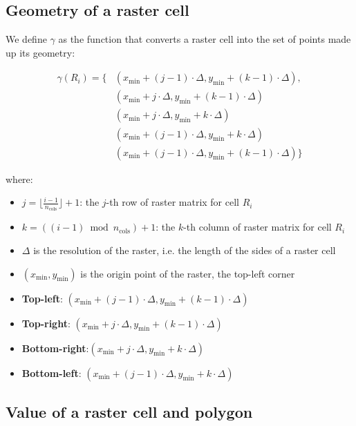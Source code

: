 
\subsection{Geometry of a raster cell} \label{sect:raster-cell-geom}

We define $\gamma$ as the function that converts a raster cell into the set of points made up its geometry:

\begin{equation*}
    \begin{split}
        \gamma(R_i) = \{
            &(x_{\text{min}}+(j-1)\cdot\Delta, y_{\text{min}}+(k-1)\cdot\Delta),\\
            &(x_{\text{min}}+j\cdot\Delta, y_{\text{min}}+(k-1)\cdot\Delta)\\
            &(x_{\text{min}}+j\cdot\Delta, y_{\text{min}}+k\cdot\Delta)\\
            &(x_{\text{min}}+(j-1)\cdot\Delta, y_{\text{min}}+k\cdot\Delta)\\
            &(x_{\text{min}}+(j-1)\cdot\Delta, y_{\text{min}}+(k-1)\cdot\Delta)
        \}
    \end{split}
\end{equation*}

where:
\begin{itemize}
    \item $j = \lfloor \frac{i-1}{n_\text{cols}} \rfloor + 1$: the $j$-th row of raster matrix for cell $R_i$
    \item $k = ((i-1) \bmod n_\text{cols}) + 1$: the $k$-th column of raster matrix for cell $R_i$
    \item $\Delta$ is the resolution of the raster, i.e. the length of the sides of a raster cell
    \item $(x_\text{min},y_\text{min})$ is the origin point of the raster, the top-left corner
    \item \textbf{Top-left}: $(x_{\text{min}}+(j-1)\cdot\Delta, y_{\text{min}}+(k-1)\cdot\Delta)$
    \item \textbf{Top-right}: $(x_{\text{min}}+j\cdot\Delta, y_{\text{min}}+(k-1)\cdot\Delta)$
    \item \textbf{Bottom-right}:$(x_{\text{min}}+j\cdot\Delta, y_{\text{min}}+k\cdot\Delta)$
    \item \textbf{Bottom-left}: $(x_{\text{min}}+(j-1)\cdot\Delta, y_{\text{min}}+k\cdot\Delta)$
\end{itemize}

\subsection{Value of a raster cell and polygon}

